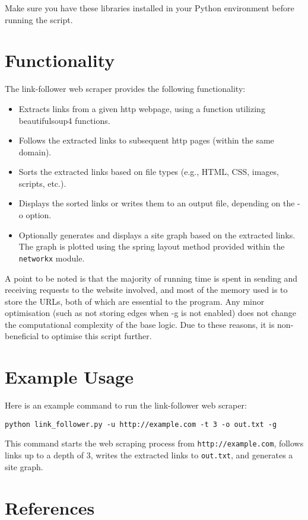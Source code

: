 \documentclass{article}
\begin{document}
Make sure you have these libraries installed in your Python environment before running the script.

\section{Functionality}
The link-follower web scraper provides the following functionality:

\begin{itemize}
  \item Extracts links from a given http webpage, using a function utilizing beautifulsoup4 \cite{richardson2007} functions.
  \item Follows the extracted links to subsequent http pages (within the same domain).
  \item Sorts the extracted links based on file types (e.g., HTML, CSS, images, scripts, etc.).
  \item Displays the sorted links or writes them to an output file, depending on the -o option.
  \item Optionally generates and displays a site graph based on the extracted links. The graph is plotted using the spring layout method provided within the \texttt{networkx} \cite{networkx} module.
\end{itemize}
A point to be noted is that the majority of running time is spent in sending and receiving requests to the website involved, and most of the memory used is to store the URLs, both of which are essential to the program. Any minor optimisation (such as not storing edges when -g is not enabled) does not change the computational complexity of the base logic. Due to these reasons, it is non-beneficial to optimise this script further.

\section{Example Usage}
Here is an example command to run the link-follower web scraper:

\begin{verbatim}
python link_follower.py -u http://example.com -t 3 -o out.txt -g
\end{verbatim}

This command starts the web scraping process from \texttt{http://example.com}, follows links up to a depth of 3, writes the extracted links to \texttt{out.txt}, and generates a site graph.

\section{References}
\end{document}
